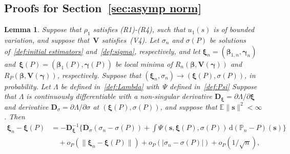 \documentclass{article}
\numberwithin{equation}{section}
\theoremstyle{plain}
\newtheorem{lemma}{Lemma}
\newcommand{\dd}{\mathrm{d}}
\newcommand{\bbeta}{\bm\beta}
\newcommand{\bxi}{\bm\xi}
\newcommand{\bgamma}{\bm\gamma}
\newcommand{\bs}{\mathbf{s}}
\newcommand{\bV}{\mathbf{V}}
\newcommand{\bD}{\mathbf{D}}
\newcommand{\E}{\mathbb{E}}
\begin{document}
\subsection{Proofs for Section~\ref{sec:asymp norm}}
\begin{lemma}
\label{lem:asymp relation xi sigma}
Suppose that $\rho_1$ satisfies (R1)-(R4), such that $u_1(s)$ is of bounded variation,
and suppose that~$\bV$ satisfies~(V4).
Let $\sigma_n$ and $\sigma(P)$ be solutions of~\eqref{def:initial estimators} and~\eqref{def:sigma}, respectively,
and let $\bxi_n=(\bbeta_{1,n},\bgamma_n)$ and~$\bxi(P)=(\bbeta_1(P),\bgamma(P))$ be local minima of $R_n(\bbeta,\bV(\bgamma))$ and 
$R_P(\bbeta,\bV(\bgamma))$, respectively.
Suppose that $(\bxi_n,\sigma_n)\to(\bxi(P),\sigma(P))$, in probability.
Let $\Lambda$ be defined in~\eqref{def:Lambda} with~$\Psi$ defined in~\eqref{def:Psi}
Suppose that $\Lambda$ is continuously differentiable with 
a non-singular derivative $\bD_{\bxi}=\partial\Lambda/\partial\bxi$ 
and derivative $\bD_{\sigma}=\partial\Lambda/\partial\sigma$
at $(\bxi(P),\sigma(P))$,
and suppose that $\E\|\bs\|^2<\infty$.
Then
\[
\begin{split}
\bxi_n-\bxi(P)
&=
-\bD_{\bxi}^{-1}
\bigg\{
\bD_\sigma(\sigma_n-\sigma(P))
+
\int \Psi(\mathbf{s},\bxi(P),\sigma(P))\,\dd (\mathbb{P}_n-P)(\mathbf{s})
\bigg\}\\
&\quad
+
o_P(\|\bxi_n-\bxi(P)\|)
+
o_P(|\sigma_n-\sigma(P)|)
+
o_P(1/\sqrt{n}),
\end{split}
\]
\end{lemma}
\end{document}
